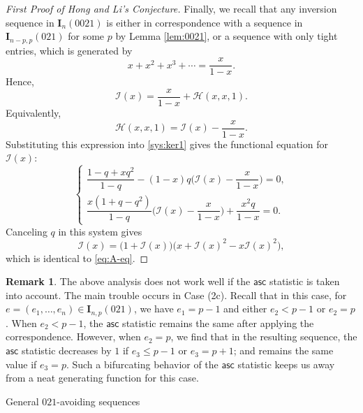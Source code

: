 \documentclass[reqno]{amsart}
\makeatletter
\numberwithin{equation}{section}
\theoremstyle{plain}
\theoremstyle{definition}
\newtheorem{remark}{Remark}[section]
\theoremstyle{named}
\def\section{\@startsection{section}{1}%
  \z@{.7\linespacing\@plus\linespacing}{.5\linespacing}%
  {\normalfont\scshape}}%
\newcommand{\bI}{\mathbf{I}}
\newcommand{\asc}{\mathsf{asc}}
\newcommand{\cI}{\mathcal{I}}
\newcommand{\cH}{\mathcal{H}}
\makeatother
\begin{document}
\begin{proof}[First Proof of Hong and Li's Conjecture]
	Finally, we recall that any inversion sequence in $\bI_n(0021)$ is either in correspondence with a sequence in $\bI_{n-p,p}(021)$ for some $p$ by Lemma \ref{lem:0021}, or a sequence with only tight entries, which is generated by
	$$x+ x^2+ x^3+\cdots = \frac{x}{1-x}.$$
	Hence,
	$$
	\cI(x)=\frac{x}{1-x}+\cH(x,x,1).
	$$
	Equivalently, 
	$$
	\cH(x,x,1)=\cI(x)-\frac{x}{1-x}. 
	$$
	Substituting this expression into \eqref{sys:ker1} gives the functional equation for $\cI(x)$:
	\begin{equation*}
		\begin{cases}
			\dfrac{1-q+xq^2}{1-q}-(1-x)q\bigg(\cI(x)-\dfrac{x}{1-x}\bigg)=0,\\[12pt]
			\dfrac{x(1+q-q^2)}{1-q}\bigg(\cI(x)-\dfrac{x}{1-x}\bigg)+\dfrac{x^2q}{1-x}=0.
		\end{cases}
	\end{equation*}
	Canceling $q$ in this system gives
	$$\cI(x)=\big(1+\cI(x)\big)\big(x+\cI(x)^2-x\cI(x)^2\big),$$
	which is identical to \eqref{eq:A-eq}.
\end{proof}

\begin{remark}
	The above analysis does not work well if the $\asc$ statistic is taken into account. The main trouble occurs in Case (2c). Recall that in this case, for $e=(e_1,\ldots,e_n)\in\bI_{n,p}(021)$, we have $e_1=p-1$ and either $e_2<p-1$ or $e_2=p$. When $e_2<p-1$, the $\asc$ statistic remains the same after applying the correspondence. However, when $e_2=p$, we find that in the resulting sequence, the $\asc$ statistic decreases by $1$ if $e_3\le p-1$ or $e_3=p+1$; and remains the same value if $e_3=p$. Such a bifurcating behavior of the $\asc$ statistic keeps us away from a neat generating function for this case.
\end{remark}

\section{General \texorpdfstring{$021$}{}-avoiding sequences}
\end{document}
